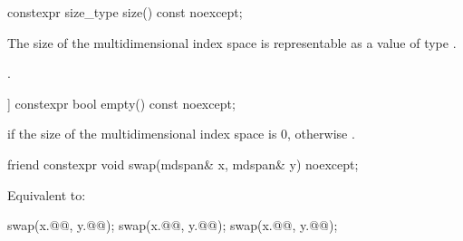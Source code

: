%
\begin{itemdecl}
constexpr size_type size() const noexcept;
\end{itemdecl}

\begin{itemdescr}
\pnum
\expects
The size of the multidimensional index space 
is representable as a value of type .

\pnum
\returns
{}.
\end{itemdescr}

%
\begin{itemdecl}
[[nodiscard]] constexpr bool empty() const noexcept;
\end{itemdecl}

\begin{itemdescr}
\pnum
\returns
{}
if the size of the multidimensional index space  is 0,
otherwise .
\end{itemdescr}

%
\begin{itemdecl}
friend constexpr void swap(mdspan& x, mdspan& y) noexcept;
\end{itemdecl}

\begin{itemdescr}
\pnum
\effects
Equivalent to:
\begin{codeblock}
swap(x.@@, y.@@);
swap(x.@@, y.@@);
swap(x.@@, y.@@);
\end{codeblock}
\end{itemdescr}
